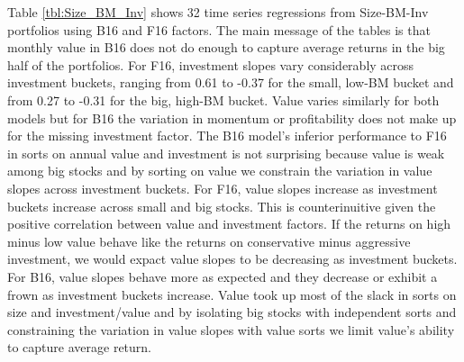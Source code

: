 
Table \ref{tbl:Size_BM_Inv} shows 32 time series regressions from Size-BM-Inv
portfolios using B16 and F16 factors.
The main message of the tables is that monthly value in B16 does not do enough
to capture average returns in the big half of the portfolios.
For F16, investment slopes vary considerably across investment buckets, ranging
from 0.61 to -0.37 for the small, low-BM bucket and from 0.27 to -0.31 for the
big, high-BM bucket.
Value varies similarly for both models but for B16 the variation in momentum or
profitability does not make up for the missing investment factor.
The B16 model's inferior performance to F16 in sorts on annual value and
investment is not surprising because value is weak among big stocks and by
sorting on value we constrain the variation in value slopes across investment
buckets.
For F16, value slopes increase as investment buckets increase across small and
big stocks.
This is counterinuitive given the positive correlation between value and
investment factors.
If the returns on high minus low value behave like the returns on conservative
minus aggressive investment, we would expact value slopes to be decreasing as
investment buckets.
For B16, value slopes behave more as expected and they decrease or exhibit a
frown as investment buckets increase.
Value took up most of the slack in sorts on size and investment/value and by
isolating big stocks with independent sorts and constraining the variation in
value slopes with value sorts we limit value's ability to capture average
return.

